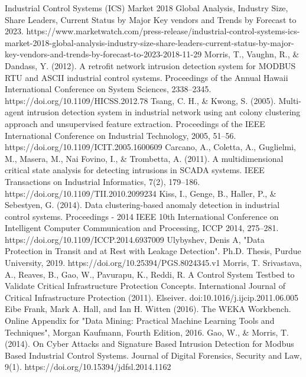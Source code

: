 \documentclass[conference]{IEEEtran}
\begin{document}
\begin{thebibliography}{00}
Industrial Control Systems (ICS) Market 2018 Global Analysis, Industry Size, Share Leaders, Current Status by Major Key vendors and Trends by Forecast to 2023. https://www.marketwatch.com/press-release/industrial-control-systems-ics-market-2018-global-analysis-industry-size-share-leaders-current-status-by-major-key-vendors-and-trends-by-forecast-to-2023-2018-11-29
Morris, T., Vaughn, R., \& Dandass, Y. (2012). A retrofit network intrusion detection system for MODBUS RTU and ASCII industrial control systems. Proceedings of the Annual Hawaii International Conference on System Sciences, 2338–2345. https://doi.org/10.1109/HICSS.2012.78
Tsang, C. H., \& Kwong, S. (2005). Multi-agent intrusion detection system in industrial network using ant colony clustering approach and unsupervised feature extraction. Proceedings of the IEEE International Conference on Industrial Technology, 2005, 51–56. https://doi.org/10.1109/ICIT.2005.1600609
Carcano, A., Coletta, A., Guglielmi, M., Masera, M., Nai Fovino, I., \& Trombetta, A. (2011). A multidimensional critical state analysis for detecting intrusions in SCADA systems. IEEE Transactions on Industrial Informatics, 7(2), 179–186. https://doi.org/10.1109/TII.2010.2099234
Kiss, I., Genge, B., Haller, P., & Sebestyen, G. (2014). Data clustering-based anomaly detection in industrial control systems. Proceedings - 2014 IEEE 10th International Conference on Intelligent Computer Communication and Processing, ICCP 2014, 275–281. https://doi.org/10.1109/ICCP.2014.6937009
 Ulybyshev, Denis A, "Data Protection in Transit and at Rest with Leakage Detection". Ph.D. Thesis, Purdue University, 2019. https://doi.org/10.25394/PGS.8024345.v1
Morris, T. Srivastava, A., Reaves, B., Gao, W., Pavurapu, K., Reddi, R. A Control System Testbed to Validate Critical Infrastructure Protection Concepts. International Journal of Critical Infrastructure Protection (2011). Elseiver. doi:10.1016/j.ijcip.2011.06.005
Eibe Frank, Mark A. Hall, and Ian H. Witten (2016). The WEKA Workbench. Online Appendix for "Data Mining: Practical Machine Learning Tools and Techniques", Morgan Kaufmann, Fourth Edition, 2016.
Gao, W., & Morris, T. (2014). On Cyber Attacks and Signature Based Intrusion Detection for Modbus Based Industrial Control Systems. Journal of Digital Forensics, Security and Law, 9(1). https://doi.org/10.15394/jdfsl.2014.1162
\end{thebibliography}
\vspace{12pt}
\end{document}
